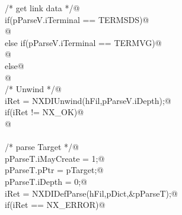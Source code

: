 \documentclass[12pt]{article}
\begin{document}
{\begin{flushleft}
\begin{minipage}{\linewidth}
\begin{list}{}{}
\mbox{}\verb@     /* get link data */@\\
\mbox{}\verb@     if(pParseV.iTerminal == TERMSDS)@\\
\mbox{}@\\
\mbox{}\verb@     else if(pParseV.iTerminal == TERMVG)@\\
\mbox{}@\\
\mbox{}\verb@     else@\\
\mbox{}@\\
\mbox{}\verb@     /* Unwind */@\\
\mbox{}\verb@     iRet = NXDIUnwind(hFil,pParseV.iDepth);@\\
\mbox{}\verb@     if(iRet != NX_OK)@\\
\mbox{}@\\
\mbox{}\verb@@\\
\mbox{}\verb@     /* parse Target */@\\
\mbox{}\verb@     pParseT.iMayCreate = 1;@\\
\mbox{}\verb@     pParseT.pPtr = pTarget;@\\
\mbox{}\verb@     pParseT.iDepth = 0;@\\
\mbox{}\verb@     iRet = NXDIDefParse(hFil,pDict,&pParseT);@\\
\mbox{}\verb@     if(iRet == NX_ERROR)@\\

\end{list}
\end{minipage}
\end{flushleft}}
\end{document}
